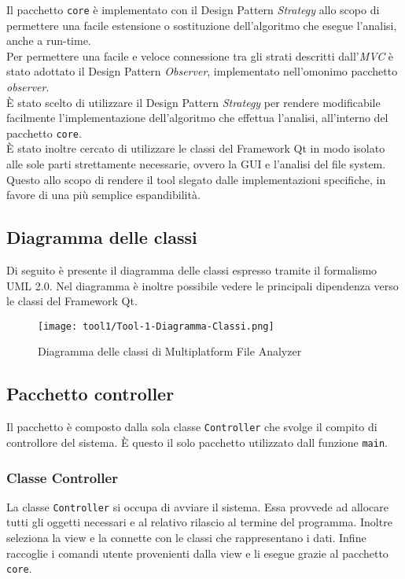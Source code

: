 	Il pacchetto \texttt{core} è implementato con il Design Pattern \textit{Strategy} allo scopo di permettere una facile estensione o sostituzione dell'algoritmo che esegue l'analisi, anche a run-time.\\
	
	Per permettere una facile e veloce connessione tra gli strati descritti dall'\textit{MVC} è stato adottato il Design Pattern \textit{Observer}, implementato nell'omonimo pacchetto \textit{observer}.\\
	
	È stato scelto di utilizzare il Design Pattern \textit{Strategy} per rendere modificabile facilmente l'implementazione dell'algoritmo che effettua l'analisi, all'interno del pacchetto \texttt{core}.\\
	
	È stato inoltre cercato di utilizzare le classi del Framework Qt in modo isolato alle sole parti strettamente necessarie, ovvero la GUI e l'analisi del file system. Questo allo scopo di rendere il tool slegato dalle implementazioni specifiche, in favore di una più semplice espandibilità.
	
	\subsection{Diagramma delle classi}
		Di seguito è presente il diagramma delle classi espresso tramite il formalismo UML 2.0. Nel diagramma è inoltre possibile vedere le principali dipendenza verso le classi del Framework Qt.
		
		\begin{figure}[!h] 
			\centering 
			\texttt{[image: tool1/Tool-1-Diagramma-Classi.png]} 
			\caption{Diagramma delle classi di Multiplatform File Analyzer}
		\end{figure}
	
		\newpage
	
	\subsection{Pacchetto controller}
		Il pacchetto è composto dalla sola classe \texttt{Controller} che svolge il compito di controllore del sistema. È questo il solo pacchetto utilizzato dall funzione \texttt{main}.
		
		\subsubsection{Classe Controller}
			La classe \texttt{Controller} si occupa di avviare il sistema. Essa provvede ad allocare tutti gli oggetti necessari e al relativo rilascio al termine del programma. Inoltre seleziona la view e la connette con le classi che rappresentano i dati. Infine raccoglie i comandi utente provenienti dalla view e li esegue grazie al pacchetto \texttt{core}.
	
